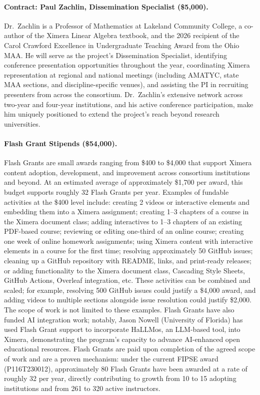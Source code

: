\documentclass[12pt,letterpaper]{article}
\begin{document}
\paragraph{Contract: Paul Zachlin, Dissemination Specialist (\$5,000).} Dr.\ Zachlin is a Professor of Mathematics at Lakeland Community College, a co-author of the Ximera Linear Algebra textbook, and the 2026 recipient of the Carol Crawford Excellence in Undergraduate Teaching Award from the Ohio MAA. He will serve as the project's Dissemination Specialist, identifying conference presentation opportunities throughout the year, coordinating Ximera representation at regional and national meetings (including AMATYC, state MAA sections, and discipline-specific venues), and assisting the PI in recruiting presenters from across the consortium. Dr.\ Zachlin's extensive network across two-year and four-year institutions, and his active conference participation, make him uniquely positioned to extend the project's reach beyond research universities.

\paragraph{Flash Grant Stipends (\$54,000).} Flash Grants are small awards ranging from \$400 to \$4,000 that support Ximera content adoption, development, and improvement across consortium institutions and beyond. At an estimated average of approximately \$1,700 per award, this budget supports roughly 32 Flash Grants per year. Examples of fundable activities at the \$400 level include: creating 2 videos or interactive elements and embedding them into a Ximera assignment; creating 1--3 chapters of a course in the Ximera document class; adding interactives to 1--3 chapters of an existing PDF-based course; reviewing or editing one-third of an online course; creating one week of online homework assignments; using Ximera content with interactive elements in a course for the first time; resolving approximately 50 GitHub issues; cleaning up a GitHub repository with README, links, and print-ready releases; or adding functionality to the Ximera document class, Cascading Style Sheets, GitHub Actions, Overleaf integration, etc. These activities can be combined and scaled; for example, resolving 500 GitHub issues could justify a \$4,000 award, and adding videos to multiple sections alongside issue resolution could justify \$2,000. The scope of work is not limited to these examples. Flash Grants have also funded AI integration work; notably, Jason Nowell (University of Florida) has used Flash Grant support to incorporate HaLLMos, an LLM-based tool, into Ximera, demonstrating the program's capacity to advance AI-enhanced open educational resources. Flash Grants are paid upon completion of the agreed scope of work and are a proven mechanism: under the current FIPSE award (P116T230012), approximately 80 Flash Grants have been awarded at a rate of roughly 32 per year, directly contributing to growth from 10 to 15 adopting institutions and from 261 to 320 active instructors.
\end{document}
